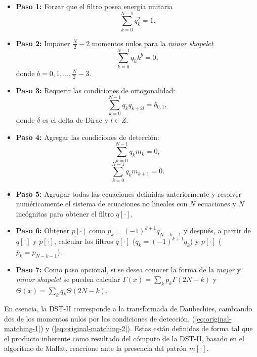 \begin{itemize}
	\item \textbf{Paso 1:} Forzar que el filtro posea energía unitaria
		\begin{equation}\label{eq:unitary-energy}
			\sum_{k=0}^{N-1}q_k^2 = 1.
		\end{equation}
	\item \textbf{Paso 2:} Imponer $\frac{N}{2} -2 $ momentos nulos para la \textit{minor shapelet}
		\begin{equation}\label{eq:vanishing-moments}
			\sum_{k=0}^{N-1}q_{k}k^b = 0,
		\end{equation}
		donde $b=0,1,\dotsc,\frac{N}{2}-3$.
	\item \textbf{Paso 3:} Requerir las condiciones de ortogonalidad:
		\begin{equation}\label{eq:orthogonality}
			\sum_{k=0}^{N-1} q_{k}q_{k+2l} = \delta_{0,1},
		\end{equation}
		donde $\delta$ es el delta de Dirac y $l\in Z$.
	\item \textbf{Paso 4:} Agregar las condiciones de detección: 
		\begin{equation}\label{eq:original-matching-1}
			\sum_{k=0}^{N-1} q_{k}m_{k} = 0,
		\end{equation}
		\begin{equation}\label{eq:original-matching-2}
			\sum_{k=0}^{N-1} q_{k}m_{k+1} = 0.
		\end{equation}
	\item \textbf{Paso 5:} Agrupar todas las ecuaciones definidas anteriormente y resolver numéricamente
		el sistema de ecuaciones no lineales con $N$ ecuaciones y $N$ incógnitas para obtener el filtro $q[\cdot]$.
	\item \textbf{Paso 6:} Obtener $p[\cdot]$ como $p_k=(-1)^{k+1}q_{N-k-1}$ y 
		después, a partir de $q[\cdot]$ y $p[\cdot]$, calcular los filtros $\bar q[\cdot]$ ($\bar q_k = (-1)^{k+1}q_k$) y $\bar p[\cdot]$ ($\bar p_k = p_{N-k-1}$).
	\item \textbf{Paso 7:} Como paso opcional, si se desea conocer la forma de la \textit{major} y \textit{minor}
		\textit{shapelet} se pueden calcular $\displaystyle \Gamma(x)=\sum_k p_k \Gamma(2N-k)$ y 
		$\displaystyle \Theta(x)=\sum_k q_k \Theta(2N-k)$.
\end{itemize}

En esencia, la DST-II corresponde a la transformada de Daubechies, cambiando dos de los momentos nulos por las
condiciones de detección, (\ref{eq:original-matching-1}) y (\ref{eq:original-matching-2}). 
Estas están definidas de forma tal que el
producto inherente como resultado del cómputo de la DST-II, basado en el algoritmo de Mallat, reaccione ante 
la presencia del patrón $m[\cdot]$.

